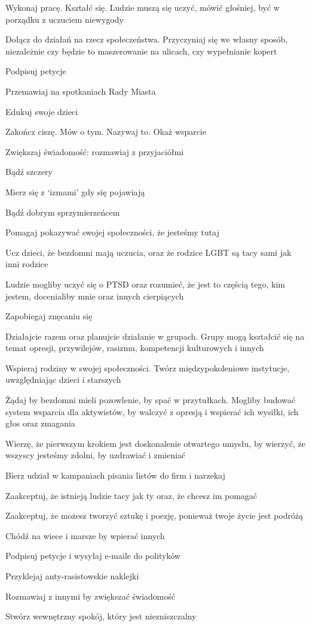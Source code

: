 \begin{multicols}{2}
	\begin{checkboxlist}
		\item Wykonaj pracę. Kształć się. Ludzie muszą się uczyć, mówić głośniej, być w porządku z uczuciem niewygody
		\item Dołącz do działań na rzecz społeczeństwa. Przyczyniaj się we własny sposób, niezależnie czy będzie to maszerowanie na ulicach, czy wypełnianie kopert
		\item Podpisuj petycje
		\item Przemawiaj na spotkaniach Rady Miasta
		\item Edukuj swoje dzieci
		\item Zakończ ciszę. Mów o tym. Nazywaj to. Okaż wsparcie
		\item Zwiększaj świadomość: rozmawiaj z przyjaciółmi
		\item Bądź szczery
		\item Mierz się z ‘izmami’ gdy się pojawiają
		\item Bądź dobrym sprzymierzeńcem
		\item Pomagaj pokazywać swojej społeczności, że jesteśmy tutaj
		\item Ucz dzieci, że bezdomni mają uczucia, oraz że rodzice LGBT są tacy sami jak inni rodzice
		\item Ludzie mogliby uczyć się o PTSD oraz rozumieć, że jest to częścią tego, kim jestem, docenialiby mnie oraz innych cierpiących
		\item Zapobiegaj znęcaniu się
		\item Działajcie razem oraz planujcie działanie w grupach. Grupy mogą kształcić się na temat opresji, przywilejów, rasizmu, kompetencji kulturowych i innych
		\item Wspieraj rodziny w swojej społeczności. Twórz międzypokoleniowe instytucje, uwzględniając dzieci i starszych
		\item Żądaj by bezdomni mieli pozowlenie, by spać w przytułkach. Mogliby budować system wsparcia dla aktywistów, by walczyć z opresją i wspierać ich wysiłki, ich głos oraz zmagania
		\item Wierzę, że pierwszym krokiem jest doskonalenie otwartego umysłu, by wierzyć, że wszyscy jesteśmy zdolni, by uzdrawiać i zmieniać
		\item Bierz udział w kampaniach pisania listów do firm i narzekaj
		\item Zaakceptuj, że istnieją ludzie tacy jak ty oraz, że chcesz im pomagać
		\item Zaakceptuj, że możesz tworzyć sztukę i poezję, ponieważ twoje życie jest podróżą
		\item Chódź na wiece i marsze by wpierać innych
		\item Podpisuj petycje i wysyłaj e-maile do polityków
		\item Przyklejaj anty-rasistowskie naklejki
		\item Rozmawiaj z innymi by zwiększać świadomość
		\item Stwórz wewnętrzny spokój, który jest niezniszczalny
	\end{checkboxlist}
\end{multicols}

